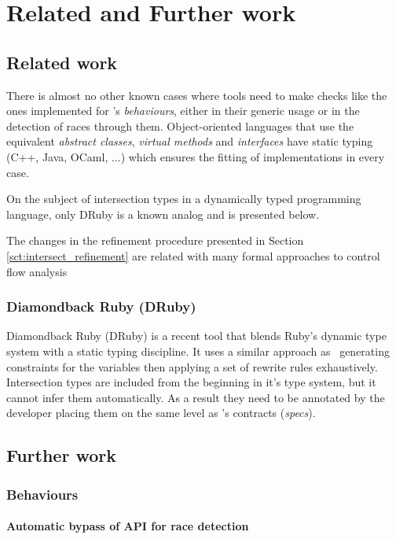 \chapter{Related and Further work}

\section{Related work}
\label{sct:related_work}

There is almost no other known cases where tools need to make checks
like the ones implemented for \er's \emph{behaviours}, either in their
generic usage or in the detection of races through
them. Object-oriented languages that use the equivalent \emph{abstract
  classes}, \emph{virtual methods} and \emph{interfaces} have static
typing (C++, Java, OCaml, ...) which ensures the fitting of
implementations in every case.

On the subject of intersection types in a dynamically typed
programming language, only DRuby is a known analog and is presented
below.

The changes in the refinement procedure presented in Section
\ref{sct:intersect_refinement} are related with many formal approaches
to control flow analysis

\subsection{Diamondback Ruby (DRuby)}

Diamondback Ruby (DRuby)\cite{druby} is a recent tool that blends
Ruby's dynamic type system with a static typing discipline. It uses a
similar approach as \dr\ generating constraints for the variables then
applying a set of rewrite rules exhaustively. Intersection types are
included from the beginning in it's type system, but it cannot infer
them automatically. As a result they need to be annotated by the
developer placing them on the same level as \dr's contracts
(\emph{specs}).

\section{Further work}
\label{sct:further_work}

\subsection{Behaviours}
\subsubsection{Automatic bypass of API for race detection}

